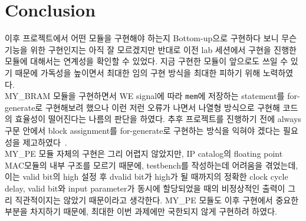 \documentclass{article}
\begin{document}
\section{Conclusion}

이후 프로젝트에서 어떤 모듈을 구현해야 하는지 Bottom-up으로 구현하다 보니 무슨 기능을 위한 구현인지는 아직 잘 모르겠지만 반대로 이전 lab 세션에서 구현을 진행한 모듈에 대해서는 연계성을 확인할 수 있었다. 지금 구현한 모듈이 앞으로도 쓰일 수 있기 때문에 가독성을 높이면서 최대한 임의 구현 방식을 최대한 피하기 위해 노력하였다. \\

MY\_BRAM 모듈을 구현하면서 WE signal에 따라 \texttt{mem}에 저장하는 statement를 for-generate로 구현해보려 했으나 이런 저런 오류가 나면서 나열형 방식으로 구현해 코드의 효율성이 떨어진다는 나름의 판단을 하였다. 추후 프로젝트를 진행하기 전에 always 구문 안에서 block assignment를 for-generate로 구현하는 방식을 익혀야 겠다는 필요성을 제고하였다~\cite{thomas2008verilog}.\\

MY\_PE 모듈 자체의 구현은 그리 어렵지 않았지만, IP catalog의 floating point MAC모듈의 내부 구조를 모르기 때문에, testbench를 작성하는데 어려움을 겪었는데, 이는 valid bit의 high 설정 후 dvalid bit가 high가 될 때까지의 정확한 clock cycle delay, valid bit와 input parameter가 동시에 할당되었을 때의 비정상적인 출력이 그리 직관적이지는 않았기 때문이라고 생각한다. MY\_PE 모듈도 이후 구현에서 중요한 부분을 차지하기 때문에, 최대한 이번 과제에만 국한되지 않게 구현하려 하였다. 



\end{document}
